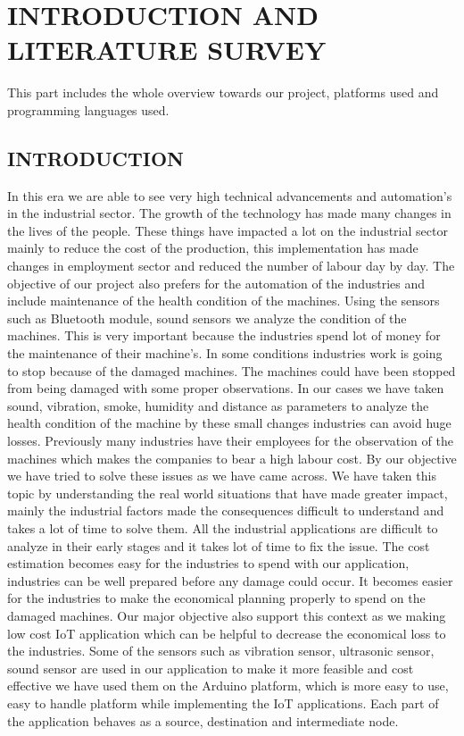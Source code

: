\chapter{INTRODUCTION AND LITERATURE SURVEY}
This part includes the whole overview towards our project, platforms used and programming languages used.
\section{INTRODUCTION}
In this era we are able to see very high technical advancements and automation's in the industrial sector. The growth of the technology has made many changes in the lives of the people. These things have impacted a lot on the industrial sector mainly to reduce the cost of the production, this implementation has made changes in employment sector and reduced the number of labour day by day. The objective of our project also prefers for the automation of the industries and include maintenance of the health condition of the machines. Using the sensors such as Bluetooth module, sound sensors we analyze the condition of the machines. This is very important because the industries spend lot of money for the maintenance of their machine's. In some conditions industries work is going to stop because of the damaged machines. The machines could have been stopped from being damaged with some proper observations. In our cases we have taken sound, vibration, smoke, humidity and distance as parameters to analyze the health condition of the machine by these small changes industries can avoid huge losses. Previously many industries have their employees for the observation of the machines which makes the companies to bear a high labour cost. By our objective we have tried to solve these issues as we have came across. We have taken this topic by understanding the real world situations that have made greater impact, mainly the industrial factors made the consequences difficult to understand and takes a lot of time to solve them. All the industrial applications are difficult to analyze in their early stages and it takes lot of time to fix the issue. The cost estimation becomes easy for the industries to spend with our application, industries can be well prepared before any damage could occur. It becomes easier for the industries to make the economical planning properly to spend on the damaged machines. Our major objective also support this context as we making low cost IoT application which can be helpful to decrease the economical loss to the industries. Some of the sensors such as vibration sensor, ultrasonic sensor, sound sensor are used in our application to make it more feasible and cost effective we have used them on the Arduino platform, which is more easy to use, easy to handle platform while implementing the IoT applications. Each part of the application behaves as a source, destination and intermediate node. 


